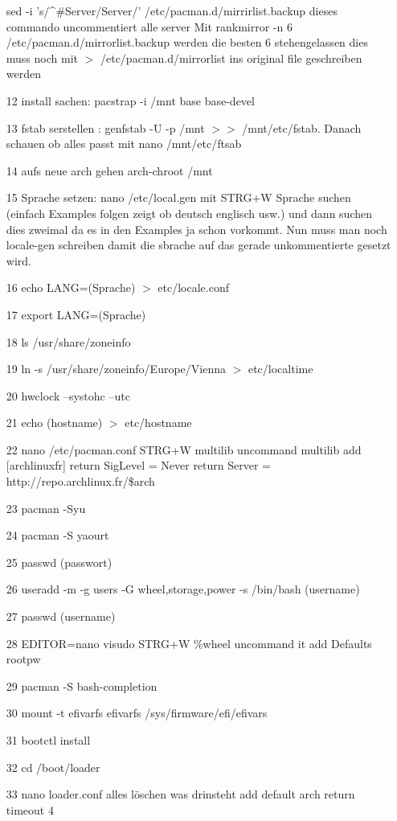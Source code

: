 \documentclass[a4paper,12pt]{article}
\begin{document}
\begin{itemize}
	\subitem sed -i 's/\^{}\#Server/Server/' /etc/pacman.d/mirrirlist.backup dieses commando uncommentiert alle server
	\subitem Mit rankmirror -n 6 /etc/pacman.d/mirrorlist.backup werden die besten 6 stehengelassen dies muss noch mit $>$ /etc/pacman.d/mirrorlist ins original file geschreiben werden
	\item[12] install sachen: pacstrap -i /mnt base base-devel
	\item[13] fstab serstellen : genfstab -U -p /mnt $>>$ /mnt/etc/fstab. Danach schauen ob alles passt mit nano /mnt/etc/ftsab
	\item[14] aufs neue arch gehen arch-chroot /mnt
	\item[15] Sprache setzen: nano /etc/local.gen mit STRG+W Sprache suchen (einfach Examples folgen zeigt ob deutsch englisch usw.) und dann suchen dies zweimal da es in den Examples ja schon vorkommt. Nun muss man noch locale-gen schreiben damit die sbrache auf das gerade unkommentierte gesetzt wird.
	\item[16] echo LANG=(Sprache) $>$ etc/locale.conf
	\item[17] export LANG=(Sprache) 
	\item[18] ls /usr/share/zoneinfo
	\item[19] ln -s /usr/share/zoneinfo/Europe/Vienna $>$ etc/localtime
	\item[20] hwclock --systohc --utc
	\item[21] echo (hostname) $>$ etc/hostname
	\item[22] nano /etc/pacman.conf        STRG+W multilib      uncommand multilib       add [archlinuxfr] return SigLevel = Never return Server = http://repo.archlinux.fr/\$arch
	\item[23] pacman -Syu
	\item[24] pacman -S yaourt
	\item[25] passwd (passwort)
	\item[26] useradd -m -g users -G wheel,storage,power -s /bin/bash (username)
	\item[27] passwd	(username)
	\item[28] EDITOR=nano visudo       STRG+W \%wheel     uncommand it       add       Defaults rootpw
	\item[29] pacman -S bash-completion
	\item[30] mount -t efivarfs efivarfs /sys/firmware/efi/efivars
	\item[31] bootctl install
	\item[32] cd /boot/loader
	\item[33] nano loader.conf       alles löschen was drinsteht       add   default arch return timeout 4

\end{itemize}
\end{document}
